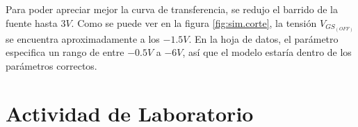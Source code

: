     Para poder apreciar mejor la curva de transferencia, se redujo el barrido de la fuente hasta $3V$. Como se puede ver
    en la figura \ref{fig:sim.corte}, la tensión $V_{GS_{(OFF)}}$ se encuentra aproximadamente a los $-1.5V$. En la hoja
    de datos, el parámetro especifica un rango de entre $-0.5V$ a $-6V$, así que el modelo estaría dentro de los
    parámetros correctos.

  \section{Actividad de Laboratorio}
